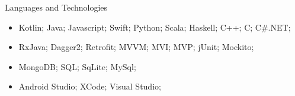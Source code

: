 \documentclass{mcdowellcv}
\begin{document}
	\begin{cvsection}{Languages and Technologies}
		\begin{cvsubsection}{}{}{}	
			\begin{itemize}
				\item Kotlin; Java; Javascript; Swift; Python; Scala; Haskell; C++; C; C\#.NET;
				\item RxJava; Dagger2; Retrofit; MVVM; MVI; MVP; jUnit; Mockito;
				\item MongoDB; SQL; SqLite; MySql;
                \item Android Studio; XCode; Visual Studio;
			\end{itemize}
		\end{cvsubsection}
	\end{cvsection}
	
\end{document}
